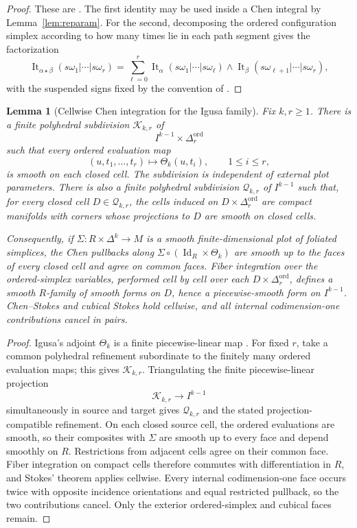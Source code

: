 \documentclass[12pt]{amsart}
\newtheorem{lem}[thm]{Lemma}
\theoremstyle{definition}
\theoremstyle{remark}
\numberwithin{equation}{section}
\newcommand{\1}{{\mathbb{1}}}
\newcommand{\id}{\operatorname{Id}}
\begin{document}
\begin{proof}
These are \cite[Lemmas 4.7 and 4.8]{Igu09}.  The first identity may be
used inside a Chen integral by Lemma~\ref{lem:reparam}.  For the second,
decomposing the ordered configuration simplex according to how many
times lie in each path segment gives the factorization
\[
 \operatorname{It}_{\alpha\star\beta}
 (s\omega_1|\cdots|s\omega_r)
 =
 \sum_{\ell=0}^r
 \operatorname{It}_{\alpha}
 (s\omega_1|\cdots|s\omega_\ell)
 \wedge
 \operatorname{It}_{\beta}
 (s\omega_{\ell+1}|\cdots|s\omega_r),
\]
with the suspended signs fixed by the convention of
\cite[Lemma 3.19]{AS12}.
\end{proof}

\begin{lem}[Cellwise Chen integration for the Igusa family]
\label{lem:cellwise-chen-igusa}
Fix $k,r\geq1$.  There is a finite polyhedral subdivision
$\mathcal K_{k,r}$ of
\[
 I^{k-1}\times\Delta_r^{\mathrm{ord}}
\]
such that every ordered evaluation map
\[
 (u,t_1,\ldots,t_r)\longmapsto\Theta_k(u,t_i),
 \qquad 1\leq i\leq r,
\]
is smooth on each closed cell.  The subdivision is independent of
external plot parameters.  There is also a finite polyhedral
subdivision $\mathcal Q_{k,r}$ of $I^{k-1}$ such that, for every
closed cell $D\in\mathcal Q_{k,r}$, the cells induced on
$D\times\Delta_r^{\mathrm{ord}}$ are compact manifolds with corners
whose projections to $D$ are smooth on closed cells.

Consequently, if
$\Sigma:R\times\Delta^k\to M$ is a smooth finite-dimensional plot of
foliated simplices, the Chen pullbacks along
$\Sigma\circ(\id_R\times\Theta_k)$ are smooth up to the faces of every
closed cell and agree on common faces.  Fiber integration over the
ordered-simplex variables, performed cell by cell over each
$D\times\Delta_r^{\mathrm{ord}}$, defines a smooth $R$-family of
smooth forms on $D$, hence a piecewise-smooth form on $I^{k-1}$.
Chen--Stokes and cubical Stokes hold cellwise, and all internal
codimension-one contributions cancel in pairs.
\end{lem}

\begin{proof}
Igusa's adjoint $\Theta_k$ is a finite piecewise-linear map
\cite[Proposition 4.6]{Igu09}.  For fixed $r$, take a common
polyhedral refinement subordinate to the finitely many ordered
evaluation maps; this gives $\mathcal K_{k,r}$.  Triangulating the
finite piecewise-linear projection
\[
 \mathcal K_{k,r}\longrightarrow I^{k-1}
\]
simultaneously in source and target gives $\mathcal Q_{k,r}$ and the
stated projection-compatible refinement.  On each closed source cell,
the ordered evaluations are smooth, so their composites with
$\Sigma$ are smooth up to every face and depend smoothly on $R$.
Restrictions from adjacent cells agree on their common face.
Fiber integration on compact cells therefore commutes with
differentiation in $R$, and Stokes' theorem applies cellwise.  Every
internal codimension-one face occurs twice with opposite incidence
orientations and equal restricted pullback, so the two contributions
cancel.  Only the exterior ordered-simplex and cubical faces remain.
\end{proof}
\end{document}
